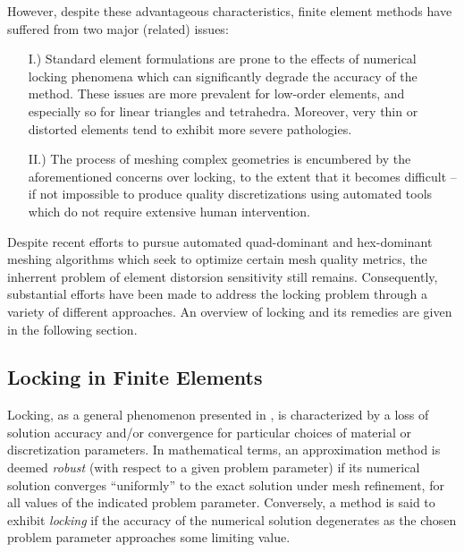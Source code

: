 	However, despite these advantageous characteristics, finite element methods have suffered from two major (related) issues:
	\begin{itemize}
		\item[I.)] Standard element formulations are prone to the effects of numerical locking phenomena which can significantly degrade the accuracy of the method. These issues are more prevalent for low-order elements, and especially so for linear triangles and tetrahedra. Moreover, very thin or distorted elements tend to exhibit more severe pathologies.
		\item[II.)] The process of meshing complex geometries is encumbered by the aforementioned concerns over locking, to the extent that it becomes difficult -- if not impossible to produce quality discretizations using automated tools which do not require extensive human intervention.
	\end{itemize}
	
	Despite recent efforts to pursue automated quad-dominant \cite{Remacle:12} and hex-dominant \cite{Xifeng:17} meshing algorithms which seek to optimize certain mesh quality metrics, the inherrent problem of element distorsion sensitivity still remains. Consequently, substantial efforts have been made to address the locking problem through a variety of different approaches. An overview of locking and its remedies are given in the following section.

	\subsection{Locking in Finite Elements}
	
		Locking, as a general phenomenon presented in \cite{Babuska&Suri:92:1}, is characterized by a loss of solution accuracy and/or convergence for particular choices of material or discretization parameters. In mathematical terms, an approximation method is deemed \textit{robust} (with respect to a given problem parameter) if its numerical solution converges ``uniformly'' to the exact solution under mesh refinement, for all values of the indicated problem parameter. Conversely, a method is said to exhibit \textit{locking} if the accuracy of the numerical solution degenerates as the chosen problem parameter approaches some limiting value.
		
